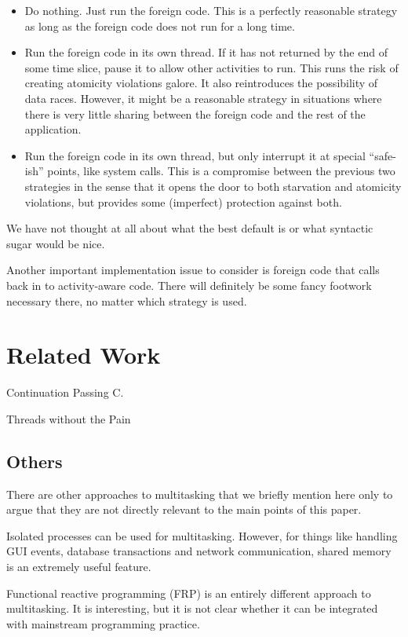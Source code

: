 \documentclass[10pt,preprint]{sigplanconf}
\begin{document}
\begin{itemize}
\item Do nothing.
  Just run the foreign code.
  This is a perfectly reasonable strategy as long as the foreign code does not run for a long time.
\item Run the foreign code in its own thread.
  If it has not returned by the end of some time slice, pause it to allow other activities to run.
  This runs the risk of creating atomicity violations galore.
  It also reintroduces the possibility of data races.
  However, it might be a reasonable strategy in situations where there is very little sharing between the foreign code and the rest of the application.
\item Run the foreign code in its own thread, but only interrupt it at special ``safe-ish'' points, like system calls.
  This is a compromise between the previous two strategies in the sense that it opens the door to both starvation and atomicity violations, but provides some (imperfect) protection against both.
\end{itemize}

We have not thought at all about what the best default is or what syntactic sugar would be nice.

Another important implementation issue to consider is foreign code that calls back in to activity-aware code.
There will definitely be some fancy footwork necessary there, no matter which strategy is used.

\section{Related Work}

Continuation Passing C.

Threads without the Pain

\subsection{Others}

There are other approaches to multitasking that we briefly mention here only to argue that they are not directly relevant to the main points of this paper.

Isolated processes can be used for multitasking.
However, for things like handling GUI events, database transactions and network communication, shared memory is an extremely useful feature.

Functional reactive programming (FRP) is an entirely different approach to multitasking.
It is interesting, but it is not clear whether it can be integrated with mainstream programming practice.
\end{document}

